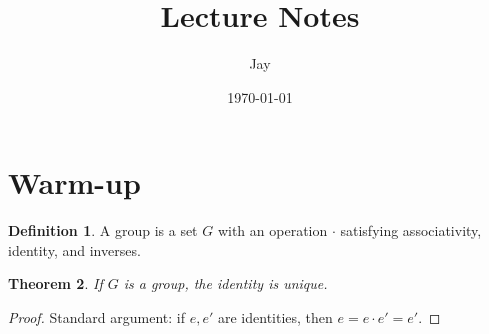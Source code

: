 \documentclass[12pt]{article}
\title{Lecture Notes}
\author{Jay}
\date{\today}
\newtheorem{theorem}{Theorem}[section]
\theoremstyle{definition}
\newtheorem{definition}[theorem]{Definition}
\begin{document}
\maketitle
\tableofcontents

\section{Warm-up}
\begin{definition}
A group is a set $G$ with an operation $\cdot$ satisfying associativity, identity, and inverses.
\end{definition}

\begin{theorem}
If $G$ is a group, the identity is unique.
\end{theorem}

\begin{proof}
Standard argument: if $e,e'$ are identities, then $e=e\cdot e'=e'$.
\end{proof}
\end{document}
